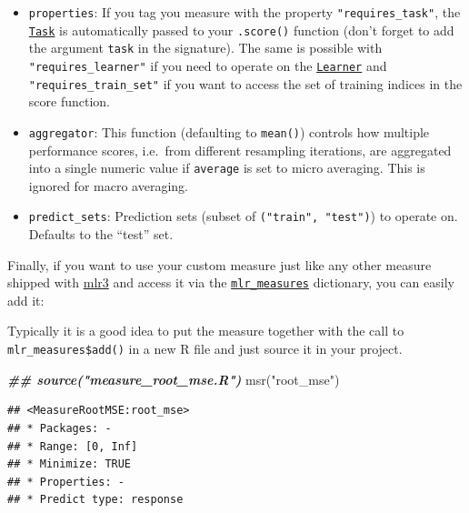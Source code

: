 \documentclass[
]{scrbook}
\newenvironment{Shaded}{\begin{snugshade}}{\end{snugshade}}
\newcommand{\DocumentationTok}[1]{\textcolor[rgb]{0.56,0.35,0.01}{\textbf{\textit{#1}}}}
\newcommand{\FunctionTok}[1]{\textcolor[rgb]{0.00,0.00,0.00}{#1}}
\newcommand{\NormalTok}[1]{#1}
\newcommand{\SpecialCharTok}[1]{\textcolor[rgb]{0.00,0.00,0.00}{#1}}
\newcommand{\StringTok}[1]{\textcolor[rgb]{0.31,0.60,0.02}{#1}}
\providecommand{\tightlist}{%
  \setlength{\itemsep}{0pt}\setlength{\parskip}{0pt}}
\renewenvironment{Shaded} {\begin{snugshade}\small} {\end{snugshade}}
\begin{document}
\begin{itemize}
\tightlist
\item
  \texttt{properties}: If you tag you measure with the property \texttt{"requires\_task"}, the \href{https://mlr3.mlr-org.com/reference/Task.html}{\texttt{Task}} is automatically passed to your \texttt{.score()} function (don't forget to add the argument \texttt{task} in the signature).
  The same is possible with \texttt{"requires\_learner"} if you need to operate on the \href{https://mlr3.mlr-org.com/reference/Learner.html}{\texttt{Learner}} and \texttt{"requires\_train\_set"} if you want to access the set of training indices in the score function.
\item
  \texttt{aggregator}: This function (defaulting to \texttt{mean()}) controls how multiple performance scores, i.e.~from different resampling iterations, are aggregated into a single numeric value if \texttt{average} is set to micro averaging.
  This is ignored for macro averaging.
\item
  \texttt{predict\_sets}: Prediction sets (subset of \texttt{("train",\ "test")}) to operate on.
  Defaults to the ``test'' set.
\end{itemize}

Finally, if you want to use your custom measure just like any other measure shipped with \href{https://mlr3.mlr-org.com}{mlr3} and access it via the \href{https://mlr3.mlr-org.com/reference/mlr_measures.html}{\texttt{mlr\_measures}} dictionary, you can easily add it:

\begin{Shaded}
\end{Shaded}

Typically it is a good idea to put the measure together with the call to \texttt{mlr\_measures\$add()} in a new R file and just source it in your project.

\begin{Shaded}
\begin{Highlighting}[]
\DocumentationTok{\#\# source("measure\_root\_mse.R")}
\FunctionTok{msr}\NormalTok{(}\StringTok{"root\_mse"}\NormalTok{)}
\end{Highlighting}
\end{Shaded}

\begin{verbatim}
## <MeasureRootMSE:root_mse>
## * Packages: -
## * Range: [0, Inf]
## * Minimize: TRUE
## * Properties: -
## * Predict type: response
\end{verbatim}
\end{document}
